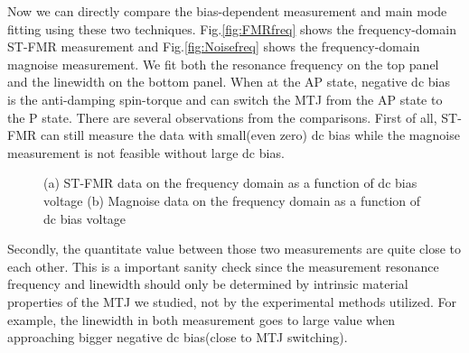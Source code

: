 Now we can directly compare the bias-dependent measurement and main mode fitting using these two techniques. Fig.\ref{fig:FMRfreq} shows the frequency-domain ST-FMR measurement and Fig.\ref{fig:Noisefreq} shows the frequency-domain magnoise measurement. We fit both the resonance frequency on the top panel and the linewidth on the bottom panel. When at the AP state, negative dc bias is the anti-damping spin-torque and can switch the MTJ from the AP state to the P state. There are several observations from the comparisons. First of all, ST-FMR can still measure the data with small(even zero) dc bias while the magnoise measurement is not feasible without large dc bias.

\begin{figure}[!ht]
\centering
{}
\caption{(a) ST-FMR data on the frequency domain as a function of dc bias voltage (b) Magnoise data on the frequency domain as a function of dc bias voltage}
\end{figure}

Secondly, the quantitate value between those two measurements are quite close to each other. This is a important sanity check since the measurement resonance frequency and linewidth should only be determined by intrinsic material properties of the MTJ we studied, not by the experimental methods utilized. For example, the linewidth in both measurement goes to large value when approaching bigger negative dc bias(close to MTJ switching).


